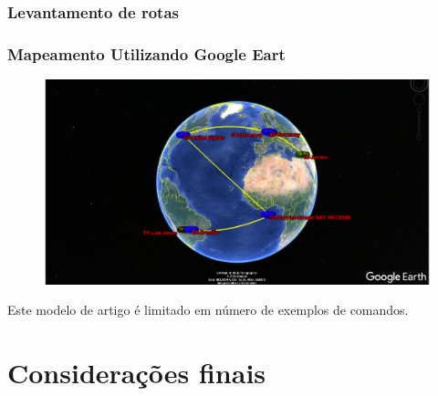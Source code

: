 \documentclass[
	article,			%
	11pt,				%
	oneside,			%
	a4paper,			%
	english,			%
	brazil,				%
	sumario=tradicional
	]{abntex2}
\begin{document}
\subsubsection{Levantamento de rotas}

\subsubsection{Mapeamento Utilizando Google Eart }

\begin{figure}[!h]
	\centering
	\includegraphics[scale=0.2]{./google-earh.png}
	
	\label{Rotulo}
\end{figure}


Este modelo de artigo é limitado em número de exemplos de comandos.

% 

\section{Considerações finais}

\lipsum[1]

\begin{citacao}
\lipsum[2]
\end{citacao}

\lipsum[3]


\end{document}

